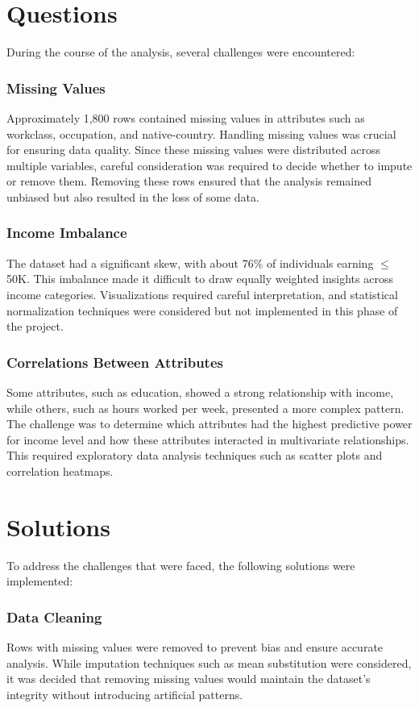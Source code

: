 \documentclass[journal,onecolumn]{IEEEtran}
\begin{document}
\section{Questions}
During the course of the analysis, several challenges were encountered:
\subsubsection{Missing Values}Approximately 1,800 rows contained missing values 
in attributes such as workclass, occupation, and native-country. Handling 
missing values was crucial for ensuring data quality. Since these missing 
values were distributed across multiple variables, careful consideration was 
required to decide whether to impute or remove them. Removing these rows 
ensured that the analysis remained unbiased but also resulted in the loss 
of some data.
\subsubsection{Income Imbalance}The dataset had a significant skew, with about 
76\% of individuals earning $\leq$50K. This imbalance made it difficult to 
draw equally weighted insights across income categories. Visualizations 
required careful interpretation, and statistical normalization techniques 
were considered but not implemented in this phase of the project.
\subsubsection{Correlations Between Attributes}Some attributes, such as 
education, showed a strong relationship with income, while others, such as 
hours worked per week, presented a more complex pattern. The challenge was to 
determine which attributes had the highest predictive power for income level 
and how these attributes interacted in multivariate relationships. This 
required exploratory data analysis techniques such as scatter plots and 
correlation heatmaps.

\section{Solutions}
To address the challenges that were faced, the following solutions were implemented:
\subsubsection{Data Cleaning}Rows with missing values were removed to 
prevent bias and ensure accurate analysis. While imputation techniques 
such as mean substitution were considered, it was decided that removing 
missing values would maintain the dataset's integrity without introducing 
artificial patterns.
\end{document}
